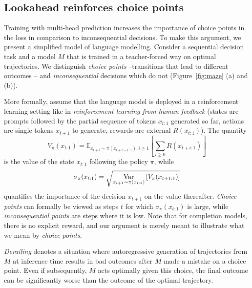 \subsection{Lookahead reinforces choice points}
\label{app:choice}

Training with multi-head prediction increases the importance of choice points in the loss in comparison to inconsequential decisions. To make this argument, we present a simplified model of language modelling. Consider a sequential decision task and a model $M$ that is trained in a teacher-forced way on optimal trajectories. We distinguish \emph{choice points} --transitions that lead to different outcomes -- and \emph{inconsequential} decisions which do not (Figure~\ref{fig:maze} (a) and (b)).

More formally, assume that the language model is deployed in a reinforcement learning setting like in \emph{reinforcement learning from human feedback} \cite{ouyang2022training} (states are prompts followed by the partial sequence of tokens $x_{t:1}$ generated so far, actions are single tokens  $x_{t+1}$ to generate, rewards are external $R(x_{t:1})$). The quantity
\[
V_\pi(x_{t:1}) = \mathbb{E}_{x_{t+i} \sim \pi(x_{t+i-1:1}), i \geq 1} \left[ \sum_{i \geq 0} R(x_{t+i:1}) \right]
\]
is the value of the state $x_{t:1}$ following the policy $\pi$, while
\[
\sigma_\pi(x_{t:1}) = \sqrt{\operatorname*{Var}_{x_{t+1} \sim \pi(x_{t:1})} \left[ 
V_\pi(x_{t+1:1}) \right] }
\]
quantifies the importance of the decision $x_{t+1}$ on the value thereafter. \emph{Choice points} can formally be viewed as steps $t$ for which $\sigma_\pi(x_{t:1})$ is large, while \emph{inconsequential points} are steps where it is low. Note that for completion models, there is no explicit reward, and our argument is merely meant to illustrate what we mean by \emph{choice points}.

\emph{Derailing} denotes a situation where autoregressive generation of trajectories from $M$ at inference time results in bad outcomes after $M$ made a mistake on a choice point. Even if subsequently, $M$ acts optimally given this choice, the final outcome can be significantly worse than the outcome of the optimal trajectory.

